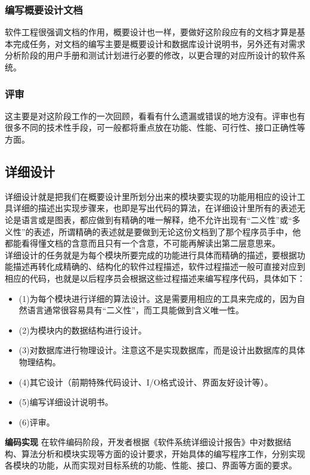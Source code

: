 \documentclass[UTF8,nofonts]{ctexart}
\makeatletter
\renewcommand{\section}{\@startsection{section}{1}{0mm}
  {-\baselineskip}{0.5\baselineskip}{\fontsize{16pt}{16pt}\bf\leftline}}
\makeatother
\begin{document}
\subsubsection{\textbf{编写概要设计文档}}
软件工程很强调文档的作用，概要设计也一样，要做好这阶段应有的文档才算是基本完成任务，对文档的编写主要是概要设计和数据库设计说明书，另外还有对需求分析阶段的用户手册和测试计划进行必要的修改，以更合理的对应所设计的软件系统。\subsubsection{评审}
这主要是对这阶段工作的一次回顾，看看有什么遗漏或错误的地方没有。评审也有很多不同的技术性手段，可一般都将重点放在功能、性能、可行性、接口正确性等方面。
\subsection{\textbf{详细设计}}
详细设计就是把我们在概要设计里所划分出来的模块要实现的功能用相应的设计工具详细的描述出实现步骤来，也即是写出代码的算法，在详细设计里所有的表述无论是语言或是图表，都应做到有精确的唯一解释，绝不允许出现有“二义性”或“多义性”的表述，所谓精确的表述就是要做到无论这份文档到了那个程序员手中，他都能看得懂文档的含意而且只有一个含意，不可能再解读出第二层意思来。\\
详细设计的任务就是为每个模块所要完成的功能进行具体而精确的描述，要根据功能描述再转化成精确的、结构化的软件过程描述，软件过程描述一般可直接对应到相应的代码，也就是以后程序员会根据这些过程描述来编写程序代码，具体如下：
\begin{itemize}
\setlength{\itemsep}{0pt}
\setlength{\parskip}{0pt}
\setlength{\parsep}{0pt}
\item (1)为每个模块进行详细的算法设计。这是需要用相应的工具来完成的，因为自然语言通常很容易具有“二义性”，而工具能做到含义唯一性。
\item	(2)为模块内的数据结构进行设计。
\item	(3)对数据库进行物理设计。注意这不是实现数据库，而是设计出数据库的具体物理结构。
\item	(4)其它设计（前期特殊代码设计、I/O格式设计、界面友好设计等）。
\item	(5)编写详细设计说明书。
\item	(6)评审。
\end{itemize}
\section{\textbf{编码实现}}
在软件编码阶段，开发者根据《软件系统详细设计报告》中对数据结构、算法分析和模块实现等方面的设计要求，开始具体的编写程序工作，分别实现各模块的功能，从而实现对目标系统的功能、性能、接口、界面等方面的要求。
\end{document}
